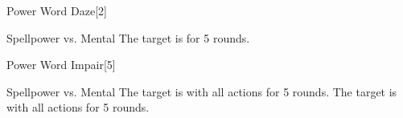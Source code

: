 \begin{spellsection}{Power Word Daze}[2]
    \begin{spellheader}
    \end{spellheader}
    \begin{spellcontent}
        \begin{spelltargetinginfo}
        \end{spelltargetinginfo}
        \begin{spelleffects}
            \begin{spellattack}{Spellpower vs. Mental}
                \spellsuccess The target is \dazed for 5 rounds.
            \end{spellattack}
        \end{spelleffects}
    \end{spellcontent}
    \begin{spellfooter}
        \miscastrandom
    \end{spellfooter}
\end{spellsection}

\begin{spellsection}{Power Word Impair}[5]
    \begin{spellheader}
    \end{spellheader}
    \begin{spellcontent}
        \begin{spelltargetinginfo}
        \end{spelltargetinginfo}
        \begin{spelleffects}
            \begin{spellattack}{Spellpower vs. Mental}
                \spellsuccess The target is \severelyimpaired with all actions for 5 rounds.
                \spellfailure The target is \impaired with all actions for 5 rounds.
            \end{spellattack}
        \end{spelleffects}
    \end{spellcontent}
    \begin{spellfooter}
        \miscastrandom
    \end{spellfooter}
\end{spellsection}

